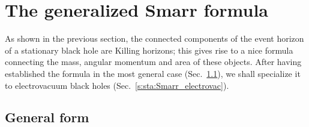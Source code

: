 
\section{The generalized Smarr formula} \label{s:sta:Smarr}

As shown in the previous section, the connected components of the event horizon of a stationary black hole are Killing horizons; this gives rise to a nice formula connecting the
mass, angular momentum and area of these objects. After having established
the formula in the most general case (Sec.~\ref{s:sta:Smarr_general}),
we shall specialize it to electrovacuum black holes (Sec.~\ref{s:sta:Smarr_electrovac}).

\subsection{General form} \label{s:sta:Smarr_general}

